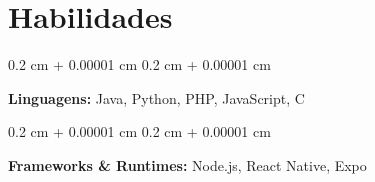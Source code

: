 \documentclass[10pt, letterpaper]{article}
\newenvironment{highlights}{
    \begin{itemize}[
        topsep=0.10 cm,
        parsep=0.10 cm,
        partopsep=0pt,
        itemsep=0pt,
        leftmargin=0.4 cm + 10pt
    ]
}{
    \end{itemize}
} %
\newenvironment{onecolentry}{
    \begin{adjustwidth}{
        0.2 cm + 0.00001 cm
    }{
        0.2 cm + 0.00001 cm
    }
}{
    \end{adjustwidth}
} %
\newenvironment{twocolentry}[2][]{
    \onecolentry
    \def\secondColumn{#2}
    \setcolumnwidth{\fill, 4.5 cm}
    \begin{paracol}{2}
}{
    \switchcolumn \raggedleft \secondColumn
    \end{paracol}
    \endonecolentry
} %
\let\hrefWithoutArrow\href
\renewcommand{\href}[2]{\hrefWithoutArrow{#1}{\ifthenelse{\equal{#2}{}}{ }{#2 }\raisebox{.15ex}{\footnotesize \faExternalLink*}}}
\begin{document}




            


    
    \section{Habilidades}

        \begin{onecolentry}
            \textbf{Linguagens:} Java, Python, PHP, JavaScript, C

        \end{onecolentry}
        
        \vspace{0.1 cm}
        \begin{onecolentry}
            \textbf{Frameworks \& Runtimes:} Node.js, React Native, Expo
        \end{onecolentry}
        
\end{document}
